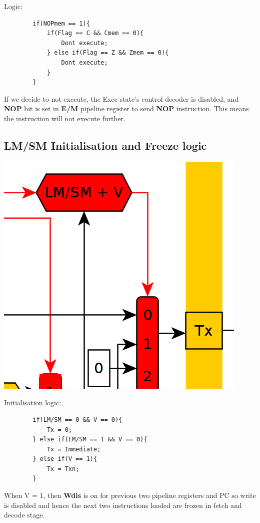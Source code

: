 \documentclass{article}
\begin{document}
Logic:
    \begin{lstlisting}
        if(NOPmem == 1){
            if(Flag == C && Cmem == 0){
                Dont execute;
            } else if(Flag == Z && Zmem == 0){
                Dont execute;
            }
        }
    \end{lstlisting}

If we decide to not execute, the Exec state's control decoder is disabled, and
\textbf{NOP} bit is set in \textbf{E/M} pipeline register to send \textbf{NOP}
instruction. This means the instruction will not execute further.

\pagebreak
\subsection*{LM/SM Initialisation and Freeze logic}

\includegraphics[scale=0.7]{lm_sm_init}


Initialisation logic:
    \begin{lstlisting}
        if(LM/SM == 0 && V == 0){
            Tx = 0;
        } else if(LM/SM == 1 && V == 0){
            Tx = Immediate;
        } else if(V == 1){
            Tx = Txn;
        }
    \end{lstlisting}

When V = 1, then \textbf{Wdis} is on for previous two pipeline registers and PC
so write is disabled and hence the next two instructions loaded are frozen in
fetch and decode stage.
\end{document}
